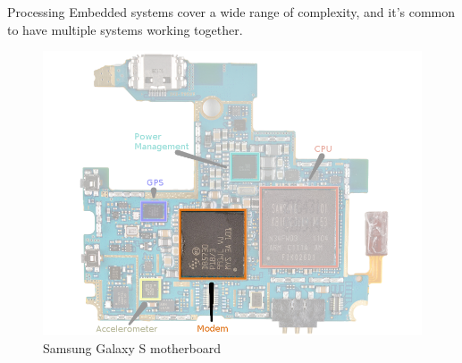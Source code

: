 \documentclass{beamer}
\begin{document}
\begin{frame}[t]{Processing}
\small
Embedded systems cover a wide range of complexity, and it's common to have multiple systems working together. \\
\vspace{1em}
\begin{figure}
\includegraphics[width=\textwidth,height=0.6\textheight,keepaspectratio,left]{img/Galaxy_Logic_Board_Edited_2_small_annotated_highlight_modem.png}
\captionsetup{justification=raggedright,singlelinecheck=false,labelformat=empty}
\caption{Samsung Galaxy S motherboard}
\end{figure}
\end{frame} 
\end{document}
